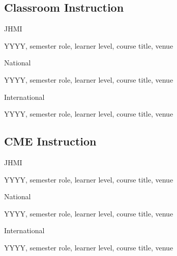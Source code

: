 \documentclass[11pt]{article}
\newenvironment{lyxlist}[1]
	{\begin{list}{}
		{\setlength\itemsep{-0.5ex}
		\settowidth{\labelwidth}{#1}
		 \setlength{\leftmargin}{\labelwidth}
		 \addtolength{\leftmargin}{\labelsep}
		 \renewcommand{\makelabel}[1]{##1\hfil}}}
	{\end{list}}
\begin{document}
\subsection*{Classroom Instruction}
\begin{lyxlist}{2020 (Winter, virtual)}

\item[{\textcolor{color1}{JHMI}}]

\item[{YYYY, semester}]role, learner level, course title, venue

\item[{\textcolor{color1}{National}}]

\item[{YYYY, semester}]role, learner level, course title, venue

\item[{\textcolor{color1}{International}}]
\item[{YYYY, semester}]role, learner level, course title, venue

\end{lyxlist}

\subsection*{CME Instruction}
\begin{lyxlist}{2020 (Winter, virtual)}

\item[{\textcolor{color1}{JHMI}}]

\item[{YYYY, semester}]role, learner level, course title, venue

\item[{\textcolor{color1}{National}}]

\item[{YYYY, semester}]role, learner level, course title, venue

\item[{\textcolor{color1}{International}}]
\item[{YYYY, semester}]role, learner level, course title, venue

\end{lyxlist}
\end{document}
